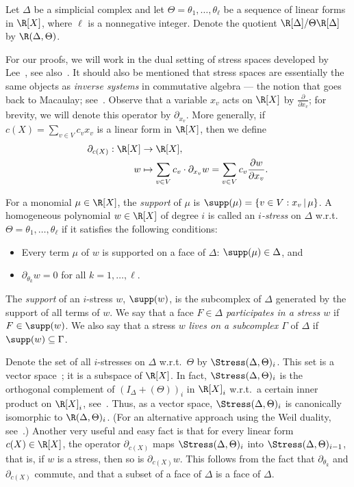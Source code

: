 Let $\Delta$ be a simplicial complex and let $\Theta=\theta_1,\ldots,\theta_\ell$ be a sequence of linear forms in $\R[X]$, where $\ell$ is a nonnegative integer. Denote the quotient $\R[\Delta]/\Theta\R[\Delta]$ by $\R(\Delta,\Theta)$. 

For our proofs, we will work in the dual setting of stress spaces developed by Lee~\cite{Lee96}, see also~\cite[Section 3]{Adiprasito-g-conj}. It should also be mentioned that stress spaces are essentially the same objects as \emph{inverse systems} in commutative algebra --- the notion that goes back to Macaulay; see~\cite[Theorem 21.6 and Exercise 21.7]{Eisenbud}. Observe that a variable $x_v$ acts on $\R[X]$ by $\frac{\partial}{\partial{x_v}}$; for brevity, we will denote this operator by $\partial_{x_v}$. More generally, if $c(X)=\sum_{v\in V} c_v x_v$ is a linear form in $\R[X]$, then we define \begin{equation*}
\begin{split}
\partial_{c(X)} : \R[X]&\to\R[X], \\
w&\mapsto \sum_{v\in V}c_v\cdot\partial_{x_v}w=\sum_{v\in V}c_v\frac{\partial w}{\partial{x_v}}.
\end{split}
\end{equation*}
	
For a monomial $\mu\in \R[X]$, the \emph{support} of $\mu$ is $\supp(\mu)=\{v\in V : x_v\,|\,\mu\}$. A homogeneous polynomial $w\in\R[X]$ of degree $i$ is called an \emph{$i$-stress} on $\Delta$ w.r.t.~$\Theta=\theta_1,\ldots,\theta_\ell$ if it satisfies the following conditions:
	\begin{itemize}
	\item Every term $\mu$ of $w$ is supported on a face of $\Delta$: $\supp(\mu)\in\Delta$, and
	\item $\partial_{\theta_k}w=0$ for all $k=1,\ldots,\ell$.
	\end{itemize}
The \emph{support} of an $i$-stress $w$, $\supp (w)$, is the subcomplex of $\Delta$ generated by the support of all terms of $w$. We say that a face $F\in\Delta$ \emph{participates in a stress $w$} if $F\in \supp(w)$. We also say that a stress $w$ \emph{lives on a subcomplex $\Gamma$} of $\Delta$ if $\supp(w)\subseteq \Gamma$.

Denote the set of all $i$-stresses on $\Delta$ w.r.t.~$\Theta$ by $\Stress(\Delta, \Theta)_i$. 
This set is a vector space~\cite{Adiprasito-g-conj,Lee96}; it is a subspace of $\R[X]$. In fact, $\Stress(\Delta, \Theta)_i$ is the orthogonal complement of $(I_\Delta+(\Theta))_i$ in $\R[X]_i$ w.r.t.~a certain inner product on $\R[X]_i$, see~\cite[Section 3]{Lee96}. Thus, as a vector space, $\Stress(\Delta, \Theta)_i$ is canonically isomorphic to $\R(\Delta, \Theta)_i$. (For an alternative approach using the Weil duality, see~\cite[Section 3]{Adiprasito-g-conj}.) Another very useful and easy fact is that for every linear form $c(X)\in \R[X]$, the operator $\partial_{c(X)}$ maps $\Stress(\Delta,\Theta)_i$ into $\Stress(\Delta, \Theta)_{i-1}$, that is, if $w$ is a stress, then so is $\partial_{c(X)}w$. This follows from the fact that $\partial_{\theta_k}$ and $\partial_{c(X)}$ commute, and that a subset of a face of $\Delta$ is a face of $\Delta$.

